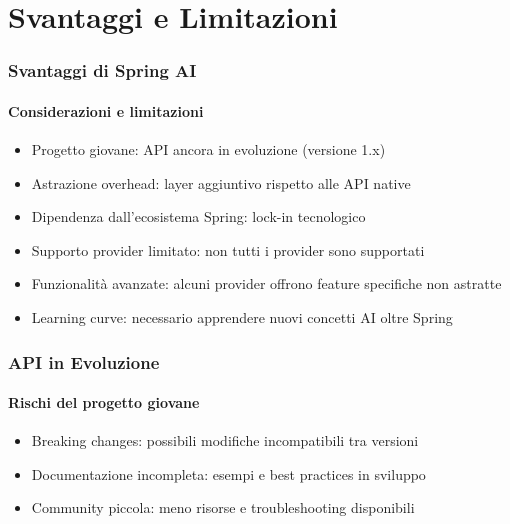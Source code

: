 \section{Svantaggi e Limitazioni} %
\label{sec:spring_ai_disadvantages}
%
\begin{frame}[t,fragile] \frametitle{Svantaggi di Spring AI}
	{\small
		\framesubtitle{Considerazioni e limitazioni}
		\begin{itemize}[leftmargin=10pt,align=right]
			\onslide<1->\item[\alert{\faArrowCircleRight}] \alert{Progetto giovane:} API ancora in evoluzione (versione 1.x)
			\onslide<2->\item[\alert{\faArrowCircleRight}] \alert{Astrazione overhead:} layer aggiuntivo rispetto alle API native
			\onslide<3->\item[\alert{\faArrowCircleRight}] \alert{Dipendenza dall'ecosistema Spring:} lock-in tecnologico
			\onslide<4->\item[\alert{\faArrowCircleRight}] \alert{Supporto provider limitato:} non tutti i provider sono supportati
			\onslide<5->\item[\alert{\faArrowCircleRight}] \alert{Funzionalità avanzate:} alcuni provider offrono feature specifiche non astratte
			\onslide<6->\item[\alert{\faArrowCircleRight}] \alert{Learning curve:} necessario apprendere nuovi concetti AI oltre Spring
		\end{itemize}
	}
\end{frame}
%
\begin{frame}[t,fragile] \frametitle{API in Evoluzione}
	{\small
		\framesubtitle{Rischi del progetto giovane}
		\begin{itemize}[leftmargin=10pt,align=right]
			\onslide<2->\item[\alert{\faArrowCircleRight}] \alert{Breaking changes:} possibili modifiche incompatibili tra versioni
			\onslide<3->\item[\alert{\faArrowCircleRight}] \alert{Documentazione incompleta:} esempi e best practices in sviluppo
			\onslide<4->\item[\alert{\faArrowCircleRight}] \alert{Community piccola:} meno risorse e troubleshooting disponibili
		\end{itemize}
		\vspace*{.3cm}
	}
\end{frame}
